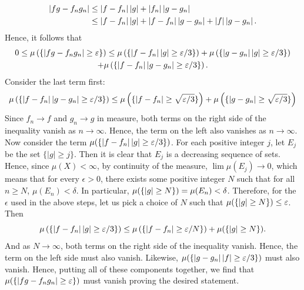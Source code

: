 \documentclass{article}
\begin{document}
\begin{enumerate}[itemsep =-2pt, label = (\alph{*})]
\begin{align}
\begin{split}
				\left| fg - f_{n}g_{n} \right| &\leq \left| f - f_{n} \right||g| + \left| f_{n} \right|\left| g - g_{n} \right| \\
				&\leq \left| f - f_{n} \right||g| + \left| f - f_{n} \right|\left| g -g_{n} \right| + \left| f \right|\left| g - g_{n} \right|. 
			\end{split}
		\end{align}
		Hence, it follows that 
		\begin{multline}
			0 \leq \mu\left(\{\left| fg - f_{n}g_{n} \right|\geq \varepsilon\}\right) \leq\mu\left(\{\left| f- f_{n} \right|\left| g \right| \geq \varepsilon/3\}\right) + \mu\left(\{\left| g-g_{n} \right|\left| g \right| \geq \varepsilon/3\}\right)  \\
			+ \mu\left(\{\left| f - f_{n} \right|\left| g - g_{n} \right| \geq \varepsilon/3\}\right). 
		\end{multline}
		Consider the last term first: 
		\begin{align}
			\begin{split}
				\mu\left(\{\left| f - f_{n} \right|\left| g - g_{n} \right|\geq \varepsilon/3\}\right) \leq \mu\left(\{\left| f - f_{n} \right| \geq \sqrt{\varepsilon/3}\}\right) + \mu\left(\{\left| g - g_{n} \right|\geq \sqrt{\varepsilon/3}\}\right)
			\end{split}
		\end{align}
		Since $f_{n} \to f$ and $g_{n} \to g$ in measure, both terms on the right side of the inequality vanish as $n \to \infty$. Hence, the term on the left also vanishes as $n \to \infty$. Now consider the term $\mu(\{\left| f - f_{n} \right|\left| g \right| \geq \varepsilon/3\})$. For each positive integer $j$, let $E_{j}$ be the set $\{|g|\geq j\}$. Then it is clear that $E_{j}$ is a decreasing sequence of sets. Hence, since $\mu(X) < \infty$, by continuity of the measure, $\lim{\mu(E_{j})} \to 0$, which means that for every $\epsilon > 0$, there exists some positive integer $N$ such that for all $n \geq N$, $\mu(E_{n}) < \delta$. In particular, $\mu(\{\left| g \right| \geq N\}) = \mu(E_{n}) < \delta$. Therefore, for the $\epsilon$ used in the above steps, let us pick a choice of $N$ such that $\mu(\{\left| g \right|\geq N\})\leq \varepsilon$. Then 
		\begin{equation}
			\mu\left(\{\left| f - f_{n} \right|\left| g \right| \geq \varepsilon/3\}\right) \leq \mu\left(\{\left| f - f_{n} \right| \geq \varepsilon/N\}\right) + \mu(\{\left| g \right|\geq N\}). 
		\end{equation}
		And as $N \to \infty$, both terms on the right side of the inequality vanish. Hence, the term on the left side must also vanish. Likewise, $\mu(\{\left| g - g_{n} \right|\left| f \right|\geq \varepsilon/3\})$ must also vanish. Hence, putting all of these components together, we find that $\mu(\{\left| fg - f_{n}g_{n} \right|\geq \varepsilon\})$ must vanish proving the desired statement. 
		

\end{enumerate}
\end{document}
